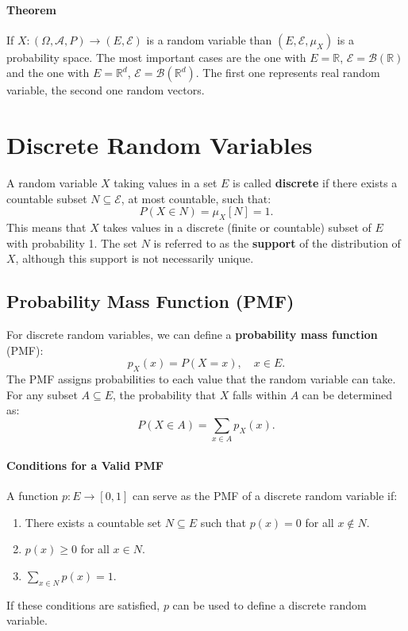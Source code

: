     \paragraph{Theorem}
    If $X:(\Omega,\mathcal{A},P) \rightarrow (E,\mathcal{E})$ is a random variable than $(E,\mathcal{E},\mu_X)$ is a probability space. The most important cases are the one with $E = \mathbb{R}$, $\mathcal{E} = \mathcal{B}(\mathbb{R})$ and the one with $E = \mathbb{R}^d$, $\mathcal{E} = \mathcal{B}(\mathbb{R}^d)$. The first one represents real random variable, the second one random vectors.
    
    \section{Discrete Random Variables}
    A random variable \( X \) taking values in a set \( E \) is called \textbf{discrete} if there exists a countable subset \( N \subseteq \mathcal{E} \), at most countable, such that:
    \[
    P(X \in N) = \mu_X[N] =  1.
    \]
    This means that \( X \) takes values in a discrete (finite or countable) subset of \( E \) with probability 1. The set \( N \) is referred to as the \textbf{support} of the distribution of \( X \), although this support is not necessarily unique.
    
    \subsection{Probability Mass Function (PMF)}
    
    For discrete random variables, we can define a \textbf{probability mass function} (PMF):
    \[
    p_X(x) = P(X = x), \quad x \in E.
    \]
    The PMF assigns probabilities to each value that the random variable can take. For any subset \( A \subseteq E \), the probability that \( X \) falls within \( A \) can be determined as:
    \[
    P(X \in A) = \sum_{x \in A} p_X(x).
    \]
    
    \paragraph{Conditions for a Valid PMF}
    
    A function \( p: E \to [0, 1] \) can serve as the PMF of a discrete random variable if:
    \begin{enumerate}
        \item There exists a countable set \( N \subseteq E \) such that \( p(x) = 0 \) for all \( x \notin N \).
        \item \( p(x) \geq 0 \) for all \( x \in N \).
        \item \(\sum_{x \in N} p(x) = 1\).
    \end{enumerate}
    If these conditions are satisfied, \( p \) can be used to define a discrete random variable.

